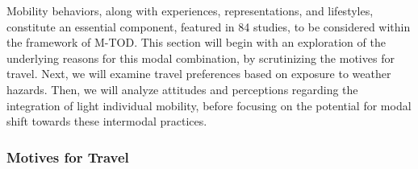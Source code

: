 \begin{refsegment}
Mobility behaviors, along with experiences, representations, and lifestyles, constitute an essential component, featured in 84 studies, to be considered within the framework of \acrshort{M-TOD}. This section will begin with an exploration of the underlying reasons for this modal combination, by scrutinizing the motives for travel. Next, we will examine travel preferences based on exposure to weather hazards. Then, we will analyze attitudes and perceptions regarding the integration of light individual mobility, before focusing on the potential for modal shift towards these intermodal practices.%

\subsubsection*{Motives for Travel
    \label{chap2:motives-for-travel}
    }


\end{refsegment}
